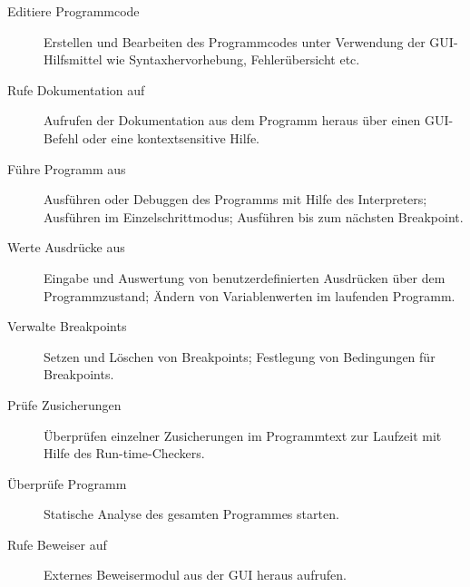 \begin{description}
	\item[Editiere Programmcode] Erstellen und Bearbeiten des Programmcodes unter Verwendung der GUI-Hilfsmittel wie Syntaxhervorhebung, Fehlerübersicht etc.
	\item[Rufe Dokumentation auf] Aufrufen der Dokumentation aus dem Programm heraus über einen GUI-Befehl oder eine kontextsensitive Hilfe.
	\item[Führe Programm aus] Ausführen oder Debuggen des Programms mit Hilfe des Interpreters; Ausführen im Einzelschrittmodus; Ausführen bis zum nächsten Breakpoint.
	\item[Werte Ausdrücke aus] Eingabe und Auswertung von benutzerdefinierten Ausdrücken über dem Programmzustand; Ändern von Variablenwerten im laufenden Programm.
	\item[Verwalte Breakpoints] Setzen und Löschen von Breakpoints; Festlegung von Bedingungen für Breakpoints.
	\item[Prüfe Zusicherungen] Überprüfen einzelner Zusicherungen im Programmtext zur Laufzeit mit Hilfe des Run-time-Checkers.
	\item[Überprüfe Programm] Statische Analyse des gesamten Programmes starten.
	\item[Rufe Beweiser auf] Externes Beweisermodul aus der GUI heraus aufrufen.
\end{description}